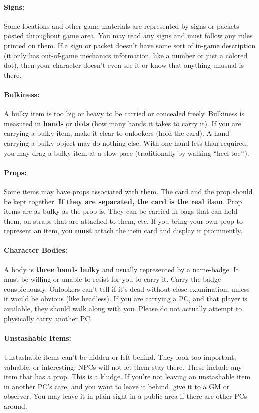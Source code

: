 \documentclass[sheet]{GL2020}
\begin{document}
\paragraph{Signs:} Some locations and other game materials are represented by signs or packets posted throughout game area. You may read any signs and must follow any rules printed on them. If a sign or packet doesn't have some sort of in-game description (it only has out-of-game mechanics information, like a number or just a colored dot), then your character doesn't even see it or know that anything unusual is there.

\paragraph{Bulkiness:} A bulky item is too big or heavy to be carried or concealed freely.  Bulkiness is measured in {\bf hands} or {\bf dots} (how many hands it takes to carry it).  If you are carrying a bulky item, make it clear to onlookers (hold the card).  A hand carrying a bulky object may do nothing else.  With one hand less than required, you may drag a bulky item at a slow pace (traditionally by walking ``heel-toe’’).

\paragraph{Props:} Some items may have props associated with them.  The card and the prop should be kept together. \textbf{If they are separated, the card is the real item}. Prop items are as bulky as the prop is. They can be carried in bags that can hold them, on straps that are attached to them, etc. If you bring your own prop to represent an item, you \textbf{must} attach the item card and display it prominently.

\paragraph{Character Bodies:} A body is {\bf three hands bulky} and usually represented by a name-badge.  It must be willing or unable to resist for you to carry it.  Carry the badge conspicuously. Onlookers can't tell if it's dead without close examination, unless it would be
obvious (like headless). If you are carrying a PC, and that player is available, they should walk along with you. Please do not actually attempt to physically carry another PC.

\paragraph{Unstashable Items:} Unstashable items can't be hidden or left behind. They look too important, valuable, or interesting; NPCs will not let them stay there. These include any item that has a prop. This is a kludge. If you're not leaving an unstashable item in another PC's care, and you want to leave it behind, give it to a GM or observer. You may leave it in plain sight in a public area if there are other PCs around.
\end{document}
